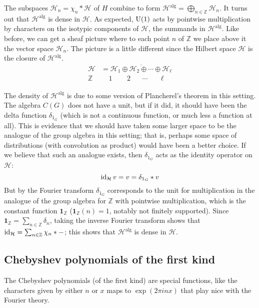 \documentclass[../../rtnotes.tex]{subfiles}
\begin{document}
The subspaces $\mathcal H_n = \chi_n\ast \mathcal H$ of $H$ combine to form $\mathcal H^{\textrm{alg}} = \bigoplus_{n\in\mathbb Z}\mathcal H_n$. It turns out that $\mathcal H^{\textrm{alg}}$ is dense in $\mathcal H$. As expected, $\operatorname{U}(1)$ acts by pointwise multiplication by characters on the isotypic components of $\mathcal H$, the summands in $\mathcal H^{\textrm{alg}}$. Like before, we can get a sheaf picture where to each point $n$ of $\mathbb Z$ we place above it the vector space $\mathcal H_n$. The picture is a little different since the Hilbert space $\mathcal H$ is the closure of $\mathcal H^{\textrm{alg}}$.
\begin{align*}
  \mathcal H &= \overline{\mathcal H_1 \oplus \mathcal H_2 \oplus \cdots \oplus \mathcal H_\ell}\\
  \mathbb Z&~~~~~1~~\phantom{\oplus}~~2~~\phantom{\oplus} \cdots \phantom{\oplus}~\,\ell
\end{align*}

The density of $\mathcal H^{\textrm{alg}}$ is due to some version of Plancherel's theorem in this setting. The algebra $C(G)$ does not have a unit, but if it did, it should have been the delta function $\delta_{1_G}$ (which is not a continuous function, or much less a function at all). This is evidence that we should have taken some larger space to be the analogue of the group algebra in this setting; that is, perhaps some space of distributions (with convolution as product) would have been a better choice. If we believe that such an analogue exists, then $\delta_{1_G}$ acts as the identity operator on $\mathcal H$:
\[\operatorname{id}_{\mathcal H}v = v = \delta_{1_G}\ast v\]
But by the Fourier transform $\delta_{1_G}$ corresponds to the unit for multiplication in the analogue of the group algebra for $\mathbb Z$ with pointwise multiplication, which is the constant function $\mathbf 1_{\mathbb Z}$ ($\mathbf 1_{\mathbb Z}(n) = 1$, notably not finitely supported). Since $\mathbf 1_{\mathbb Z} = \sum_{n\in\mathbb Z}\delta_n$, taking the inverse Fourier transform shows that $\operatorname{id}_{\mathcal H} = \sum_{n\in\mathbb Z}\chi_n\ast -$; this shows that $\mathcal H^{\textrm{alg}}$ is dense in $\mathcal H$.

\subsection{Chebyshev polynomials of the first kind}
The Chebyshev polynomials (of the first kind) are special functions, like the characters given by either $n$ or $x$ maps to $\exp(2\pi i nx)$ that play nice with the Fourier theory.
\end{document}
